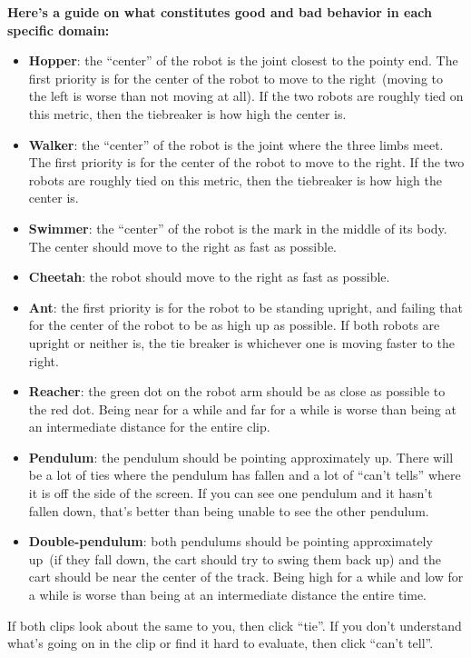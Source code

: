 \documentclass{article}
\begin{document}
\textbf{Here’s a guide on what constitutes good and bad behavior in each specific domain:}
\begin{itemize}
\item \textbf{Hopper}: the ``center'' of the robot is the joint closest to the pointy end.
The first priority is for the center of the robot to move to the right~(moving to the left is worse than not moving at all).
If the two robots are roughly tied on this metric, then the tiebreaker is how high the center is.
\item \textbf{Walker}: the ``center'' of the robot is the joint where the three limbs meet.
The first priority is for the center of the robot to move to the right.
If the two robots are roughly tied on this metric, then the tiebreaker is how high the center is.
\item \textbf{Swimmer}: the ``center'' of the robot is the mark in the middle of its body.
The center should move to the right as fast as possible.
\item \textbf{Cheetah}: the robot should move to the right as fast as possible.
\item \textbf{Ant}: the first priority is for the robot to be standing upright,
and failing that for the center of the robot to be as high up as possible.
If both robots are upright or neither is, the tie breaker is whichever one is moving faster to the right.
\item \textbf{Reacher}: the green dot on the robot arm should be as close as possible to the red dot.
Being near for a while and far for a while is worse than being at an intermediate distance for the entire clip.
\item \textbf{Pendulum}: the pendulum should be pointing approximately up.
There will be a lot of ties where the pendulum has fallen and a lot of ``can't tells'' where it is off the side of the screen.
If you can see one pendulum and it hasn't fallen down,
that’s better than being unable to see the other pendulum.
\item \textbf{Double-pendulum}: both pendulums should be pointing approximately up~(if they fall down,
the cart should try to swing them back up)
and the cart should be near the center of the track.
Being high for a while and low for a while is worse than being at an intermediate distance the entire time.
\end{itemize}

If both clips look about the same to you, then click ``tie''.
If you don't understand what's going on in the clip or find it hard to evaluate, then click ``can't tell''.
\end{document}
